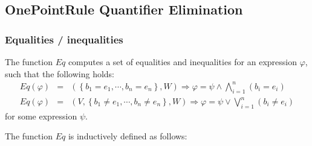 \subsection{OnePointRule Quantifier Elimination}

\subsubsection{Equalities / inequalities}

The function $Eq$ computes a set of equalities and inequalities for an
expression $\varphi $, such that the following holds:%
\begin{eqnarray*}
Eq\left( \varphi \right) &=&\left( \left\{ b_{1}=e_{1},\cdots
,b_{n}=e_{n}\right\} ,W\right) \Rightarrow \varphi =\psi \wedge
\bigwedge\limits_{i=1}^{n}\left( b_{i}=e_{i}\right) \\
Eq\left( \varphi \right) &=&\left( V,\left\{ b_{1}\neq e_{1},\cdots
,b_{n}\neq e_{n}\right\} ,W\right) \Rightarrow \varphi =\psi \vee
\bigvee\limits_{i=1}^{n}\left( b_{i}\neq e_{i}\right)
\end{eqnarray*}%
for some expression $\psi $.

The function $Eq$ is inductively defined as follows:

